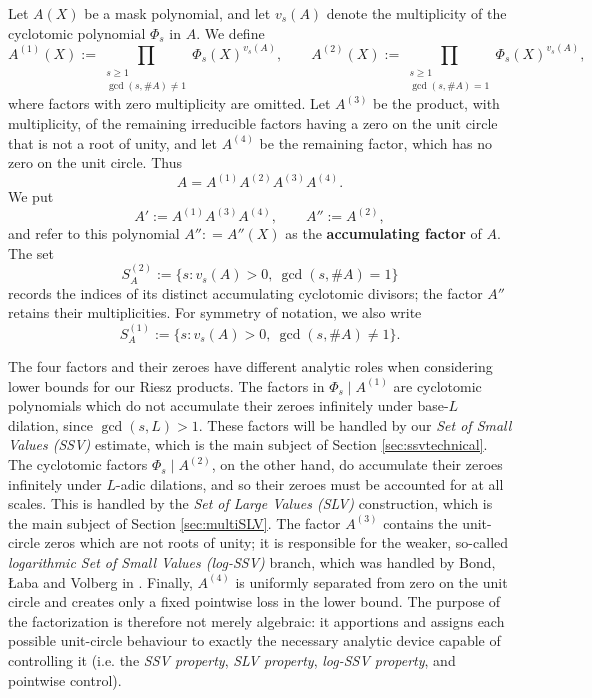 \documentclass[12pt]{amsart}
\numberwithin{equation}{section}
\begin{document}
\begin{definition}\label{def:cycfactorization}
Let $A(X)$ be a mask polynomial, and let $v_{s}(A)$ denote the multiplicity of the cyclotomic polynomial $\Phi_s$ in $A$.  We define
\[
A^{(1)}(X):=\prod_{\substack{s\geq1\\ \gcd(s,\#A)\neq1}}
\Phi_s(X)^{v_s(A)},
\qquad
A^{(2)}(X):=\prod_{\substack{s\geq1\\ \gcd(s,\#A)=1}}
\Phi_s(X)^{v_s(A)},
\]
where factors with zero multiplicity are omitted.  Let $A^{(3)}$ be the product, with multiplicity, of the remaining irreducible factors having a zero on the unit circle that is not a root of unity, and let $A^{(4)}$ be the remaining factor, which has no zero on the unit circle.  Thus
\[
A=A^{(1)}A^{(2)}A^{(3)}A^{(4)}.
\]
We put
\[
A':=A^{(1)}A^{(3)}A^{(4)},
\qquad
A'':=A^{(2)},
\]
and refer to this polynomial  $A'' : = A'' (X)$ as the \textbf{accumulating factor} of $A$.  The set
\[
S_A^{(2)}:=\{s:v_s(A)>0,\ \gcd(s,\#A)=1\}
\]
records the indices of its distinct accumulating cyclotomic divisors; the factor $A''$ retains their multiplicities.
For symmetry of notation, we also write
\[
S_A^{(1)}:=\{s:v_s(A)>0,\ \gcd(s,\#A)\neq1\}.
\]
\end{definition}

The four factors and their zeroes have different analytic roles when considering lower bounds for our Riesz products. The factors in $\Phi_s \mid A^{(1)}$ are cyclotomic polynomials which do not accumulate their zeroes infinitely under base-$L$ dilation, since $\gcd (s,L) > 1$. These factors will be handled by our \textit{Set of Small Values (SSV)} estimate, which is the main subject of Section \ref{sec:ssvtechnical}.  The cyclotomic factors $\Phi_s \mid A^{(2)}$, on the other hand, do accumulate their zeroes infinitely under $L$-adic dilations, and so their zeroes must be accounted for at all scales. This is handled by the \textit{Set of Large Values (SLV)} construction, which is the main subject of Section \ref{sec:multiSLV}.  The factor $A^{(3)}$ contains the unit-circle zeros which are not roots of unity; it is responsible for the weaker, so-called \textit{logarithmic Set of Small Values (log-SSV)}  branch, which was handled by Bond, {\L}aba and Volberg in \cite{BLV}.  Finally, $A^{(4)}$ is uniformly separated from zero on the unit circle and creates only a fixed pointwise loss in the lower bound. The purpose of the factorization is therefore not merely algebraic: it apportions and assigns each possible unit-circle behaviour to exactly the necessary analytic device capable of controlling it (i.e. the \textit{SSV property}, \textit{SLV property}, \textit{log-SSV property}, and pointwise control).
\end{document}
